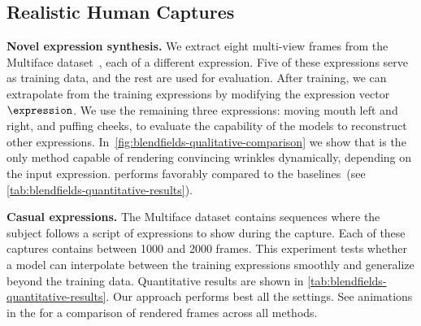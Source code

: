   \subsection{Realistic Human Captures}
    \label{subsec:blendfields-realistic-human-captures}
    \noindent\textbf{Novel expression synthesis.}
    We extract eight multi-view frames from the Multiface
    dataset~\cite{wuu2022multiface}, each of a different expression.
    Five of these expressions serve as training data, and the rest are used
    for evaluation.
    After training, we can extrapolate from the training expressions by
    modifying the expression vector~$\expression$.
    We use the remaining three expressions: moving mouth left and right, and
    puffing cheeks, to evaluate the capability of the models to reconstruct
    other expressions.
    In~\cref{fig:blendfields-qualitative-comparison} we show that \blendfields
    is the only method capable of rendering convincing wrinkles dynamically,
    depending on the input expression.
    \blendfields performs favorably compared to the baselines~(see \cref{tab:blendfields-quantitative-results}).

    \noindent\textbf{Casual expressions.}
    The Multiface dataset contains sequences where the subject follows a
    script of expressions to show during the capture.
    Each of these captures contains between 1000 and 2000 frames.
    This experiment tests whether a model can interpolate between the training
    expressions smoothly and generalize beyond the training data.
    Quantitative results are shown in
    \cref{tab:blendfields-quantitative-results}.
    Our approach performs best all the settings.
    See animations in the \supplementary{} for a comparison of rendered frames
    across all methods.

